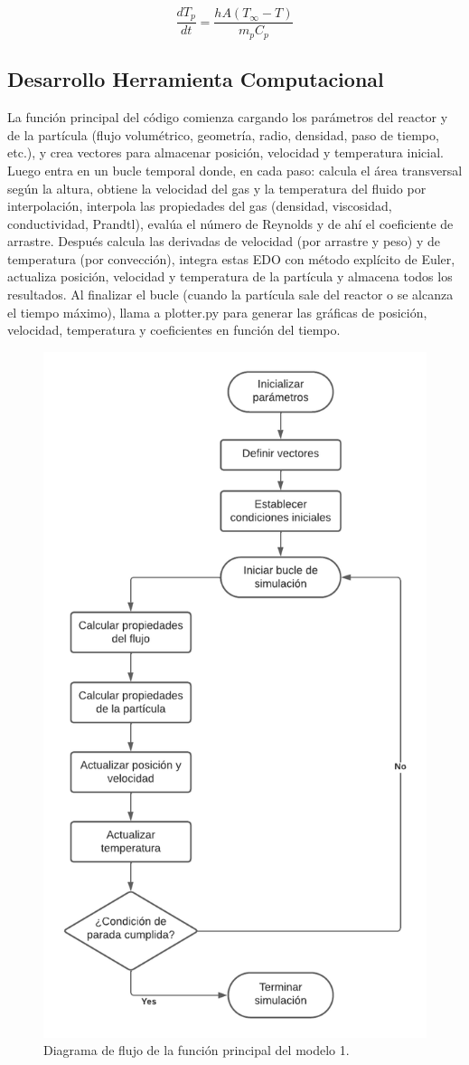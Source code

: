 \documentclass[11pt,stdletter,orderfromtodate,sigleft,twoside]{report}
\begin{document}
\begin{equation}
    \frac{dT_{p}}{dt}=\frac{hA(T_{\infty }-T)}{ m_{p}C_{p}}
\end{equation}


\subsection{Desarrollo Herramienta Computacional}

La función principal del código comienza cargando los parámetros del reactor y de la partícula (flujo volumétrico, geometría, radio, densidad, paso de tiempo, etc.), y crea vectores para almacenar posición, velocidad y temperatura inicial. Luego entra en un bucle temporal donde, en cada paso: calcula el área transversal según la altura, obtiene la velocidad del gas y la temperatura del fluido por interpolación, interpola las propiedades del gas (densidad, viscosidad, conductividad, Prandtl), evalúa el número de Reynolds y de ahí el coeficiente de arrastre. Después calcula las derivadas de velocidad (por arrastre y peso) y de temperatura (por convección), integra estas EDO con método explícito de Euler, actualiza posición, velocidad y temperatura de la partícula y almacena todos los resultados. Al finalizar el bucle (cuando la partícula sale del reactor o se alcanza el tiempo máximo), llama a plotter.py para generar las gráficas de posición, velocidad, temperatura y coeficientes en función del tiempo.

\begin{figure}[H]
    \centering
    \includegraphics[width=0.45\linewidth]{figures/Blank diagram.png}
    \caption{Diagrama de flujo de la función principal del modelo 1.}
    \label{Diagrama de flujo}
\end{figure}
\end{document}
